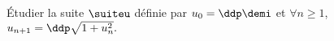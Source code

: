 \documentclass[a4paper, 11pt]{article}
\begin{document}
%
%
%

\begin{exercice} \;
\'Etudier la suite $\suiteu$ d\'efinie par $u_0=\ddp\demi$ et $\forall n \geq 1$, $u_{n+1}=\ddp\sqrt{1+u_n^2}.$
\end{exercice}
\end{document}
